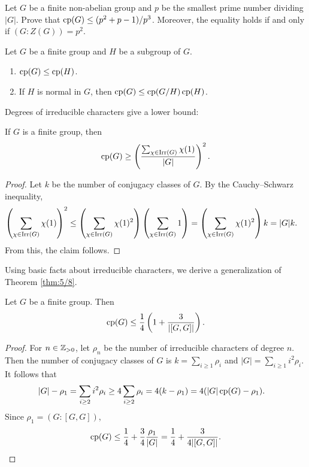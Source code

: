\begin{exercise}
\label{xca:least_p}
    Let $G$ be a finite non-abelian group and $p$ be the smallest prime number
    dividing $|G|$. Prove that $\operatorname{cp}(G)\leq (p^2+p-1)/p^3$. Moreover, 
    the equality holds if and only if $(G:Z(G))=p^2$. 
\end{exercise}

\begin{exercise}
    Let $G$ be a finite group and $H$ be a subgroup of $G$.
    \begin{enumerate}
        \item $\operatorname{cp}(G)\leq\operatorname{cp}(H)$.
        \item If $H$ is normal in $G$, then $\operatorname{cp}(G)\leq\operatorname{cp}(G/H)\operatorname{cp}(H)$.
    \end{enumerate}
\end{exercise}

Degrees of irreducible characters give a lower bound:

\begin{proposition}
If $G$ is a finite group, then
\[
\operatorname{cp}(G)\geq\left(\frac{\sum_{\chi\in\operatorname{Irr}(G)}\chi(1)}{|G|}\right)^2.
\]
\end{proposition}

\begin{proof}
    Let $k$ be the number of conjugacy classes of $G$.
    By the Cauchy--Schwarz inequality, 
    \begin{align*}
        \left(\sum_{\chi\in\operatorname{Irr}(G)}\chi(1)\right)^2
        &\leq\left(\sum_{\chi\in\operatorname{Irr}(G)}\chi(1)^2\right)\left(\sum_{\chi\in\operatorname{Irr}(G)}1\right)
        =\left(\sum_{\chi\in\operatorname{Irr}(G)}\chi(1)^2\right)k=|G|k.
    \end{align*}
    From this, the claim follows.
\end{proof}

Using basic facts about irreducible characters, we derive a generalization of Theorem \ref{thm:5/8}.

\begin{theorem}
\label{thm:[GG]}
    Let $G$ be a finite group. Then
    \[
        \operatorname{cp}(G)\leq\frac14\left(1+\frac3{|[G,G]|}\right).
    \]
\end{theorem}

\begin{proof}
    For $n\in\mathbb{Z}_{>0}$, let $\rho_n$ be the number
    of irreducible characters of degree $n$. Then 
    the number of conjugacy classes of $G$ is $k=\sum_{i\geq1}\rho_i$
    and $|G|=\sum_{i\geq1}i^2\rho_i$. 
    It follows that 
    \begin{align*}
    |G|-\rho_1 &=\sum_{i\geq 2}i^2\rho_i\geq 4\sum_{i\geq2}\rho_i
    =4(k-\rho_1)=4(|G|\operatorname{cp}(G)-\rho_1).
    \end{align*}
    Since $\rho_1=(G:[G,G])$, 
    \[
    \operatorname{cp}(G)\leq \frac14+\frac34\frac{\rho_1}{|G|}=\frac14+\frac3{4|[G,G]|}.\qedhere 
    \]
\end{proof}

